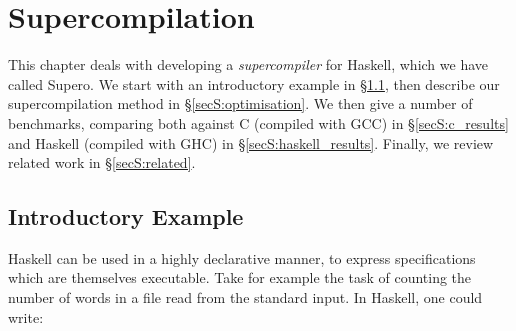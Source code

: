 \chapter{Supercompilation}
\label{chp:supero}

This chapter deals with developing a \textit{supercompiler} for Haskell, which we have called Supero. We start with an introductory example in \S\ref{secS:intro_supero}, then describe our supercompilation method in \S\ref{secS:optimisation}. We then give a number of benchmarks, comparing both against C (compiled with GCC) in \S\ref{secS:c_results} and Haskell (compiled with GHC) in \S\ref{secS:haskell_results}. Finally, we review related work in \S\ref{secS:related}.

\section{Introductory Example}
\label{secS:intro_supero}

Haskell \cite{haskell} can be used in a highly declarative manner, to express specifications which are themselves executable. Take for example the task of counting the number of words in a file read from the standard input. In Haskell, one could write:

